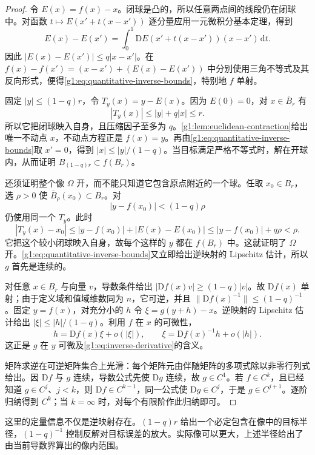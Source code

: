 \begin{proof}
	令 \(E(x)=f(x)-x\)。闭球是凸的，所以任意两点间的线段仍在闭球中。对函数 \(t\mapsto E(x'+t(x-x'))\) 逐分量应用一元微积分基本定理，得到
	\[
		E(x)-E(x')=\int_0^1\mathrm{D}E(x'+t(x-x'))(x-x')\,\mathrm{d}t.
	\]
	因此 \(|E(x)-E(x')|\leq q|x-x'|\)。在 \(f(x)-f(x')=(x-x')+(E(x)-E(x'))\) 中分别使用三角不等式及其反向形式，便得\eqref{g1:eq:quantitative-inverse-bounds}，特别地 \(f\) 单射。

	固定 \(|y|\leq(1-q)r\)，令 \(T_y(x)=y-E(x)\)。因为 \(E(0)=0\)，对 \(x\in\overline B_r\) 有
	\[
		|T_y(x)|\leq|y|+q|x|\leq r.
	\]
	所以它把闭球映入自身，且压缩因子至多为 \(q\)。\cref{g1:lem:euclidean-contraction}给出唯一不动点 \(x\)，不动点方程正是 \(f(x)=y\)。再由\eqref{g1:eq:quantitative-inverse-bounds}取 \(x'=0\)，得到 \(|x|\leq|y|/(1-q)\)。当目标满足严格不等式时，解在开球内，从而证明 \(B_{(1-q)r}\subset f(B_r)\)。

	还须证明整个像 \(\Omega\) 开，而不能只知道它包含原点附近的一个球。任取 \(x_0\in B_r\)，选 \(\rho>0\) 使 \(\overline B_\rho(x_0)\subset B_r\)。对
	\[
		|y-f(x_0)|<(1-q)\rho
	\]
	仍使用同一个 \(T_y\)。此时
	\[
		|T_y(x)-x_0|
		\leq|y-f(x_0)|+|E(x)-E(x_0)|
		\leq|y-f(x_0)|+q\rho<\rho.
	\]
	它把这个较小闭球映入自身，故每个这样的 \(y\) 都在 \(f(B_r)\) 中。这就证明了 \(\Omega\) 开。\eqref{g1:eq:quantitative-inverse-bounds}又立即给出逆映射的 Lipschitz 估计，所以 \(g\) 首先是连续的。

	对任意 \(x\in B_r\) 与向量 \(v\)，导数条件给出 \(|\mathrm{D}f(x)v|\geq(1-q)|v|\)。故 \(\mathrm{D}f(x)\) 单射；由于定义域和值域维数同为 \(n\)，它可逆，并且 \(\|\mathrm{D}f(x)^{-1}\|\leq(1-q)^{-1}\)。固定 \(y=f(x)\)，对充分小的 \(h\) 令 \(\xi=g(y+h)-x\)。逆映射的 Lipschitz 估计给出 \(|\xi|\leq|h|/(1-q)\)。利用 \(f\) 在 \(x\) 的可微性，
	\[
		h=\mathrm{D}f(x)\xi+o(|\xi|),
		\qquad
		\xi=\mathrm{D}f(x)^{-1}h+o(|h|).
	\]
	这正是 \(g\) 在 \(y\) 可微及\eqref{g1:eq:inverse-derivative}的含义。

	矩阵求逆在可逆矩阵集合上光滑：每个矩阵元由伴随矩阵的多项式除以非零行列式给出。因 \(\mathrm{D}f\) 与 \(g\) 连续，导数公式先使 \(\mathrm{D}g\) 连续，故 \(g\in C^1\)。若 \(f\in C^k\)，且已经知道 \(g\in C^j\)、\(j<k\)，则 \(\mathrm{D}f\in C^{k-1}\)，同一公式使 \(\mathrm{D}g\in C^j\)，于是 \(g\in C^{j+1}\)。逐阶归纳得到 \(C^k\)；当 \(k=\infty\) 时，对每个有限阶作此归纳即可。
\end{proof}

这里的定量信息不仅是逆映射存在。\((1-q)r\) 给出一个必定包含在像中的目标半径，\((1-q)^{-1}\) 控制反解对目标误差的放大。实际像可以更大，上述半径给出了由当前导数界算出的像内范围。

